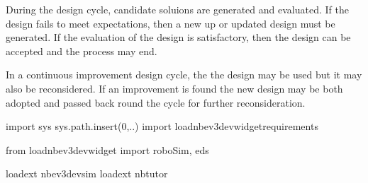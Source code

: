 \documentclass[letterpaper,10pt,english]{sphinxmanual}
\begin{document}
During the design cycle, candidate soluions are generated and evaluated. If the design fails to meet expectations, then a new up or updated design must be generated. If the evaluation of the design is satisfactory, then the design can be accepted and the process may end.

In a continuous improvement design cycle, the the design may be used but it may also be reconsidered. If an improvement is found the new design may be both adopted and passed back round the cycle for further reconsideration.

{
\begin{sphinxVerbatim}[commandchars=\\\{\}]
\llap{\color{nbsphinxin}[ ]:\,\hspace{\fboxrule}\hspace{\fboxsep}}import sys
sys.path.insert(0,\PYGZsq{}..\PYGZsq{})
import \PYGZus{}load\PYGZus{}nbev3devwidget\PYGZus{}requirements
\end{sphinxVerbatim}
}

{
\begin{sphinxVerbatim}[commandchars=\\\{\}]
\llap{\color{nbsphinxin}[ ]:\,\hspace{\fboxrule}\hspace{\fboxsep}}from \PYGZus{}load\PYGZus{}nbev3devwidget import roboSim, eds

\PYGZpc{}load\PYGZus{}ext nbev3devsim
\PYGZpc{}load\PYGZus{}ext nbtutor
\end{sphinxVerbatim}
}

{
\begin{sphinxVerbatim}[commandchars=\\\{\}]
\llap{\color{nbsphinxin}[ ]:\,\hspace{\fboxrule}\hspace{\fboxsep}}
   
\end{sphinxVerbatim}
}
\end{document}
